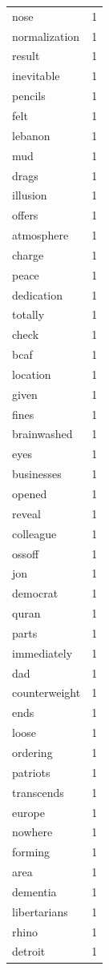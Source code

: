 \begin{tabular}{lr}
nose & 1 \\
normalization & 1 \\
result & 1 \\
inevitable & 1 \\
pencils & 1 \\
felt & 1 \\
lebanon & 1 \\
mud & 1 \\
drags & 1 \\
illusion & 1 \\
offers & 1 \\
atmosphere & 1 \\
charge & 1 \\
peace & 1 \\
dedication & 1 \\
totally & 1 \\
check & 1 \\
bcaf & 1 \\
location & 1 \\
given & 1 \\
fines & 1 \\
brainwashed & 1 \\
eyes & 1 \\
businesses & 1 \\
opened & 1 \\
reveal & 1 \\
colleague & 1 \\
ossoff & 1 \\
jon & 1 \\
democrat & 1 \\
quran & 1 \\
parts & 1 \\
immediately & 1 \\
dad & 1 \\
counterweight & 1 \\
ends & 1 \\
loose & 1 \\
ordering & 1 \\
patriots & 1 \\
transcends & 1 \\
europe & 1 \\
nowhere & 1 \\
forming & 1 \\
area & 1 \\
dementia & 1 \\
libertarians & 1 \\
rhino & 1 \\
detroit & 1 \\

\end{tabular}
